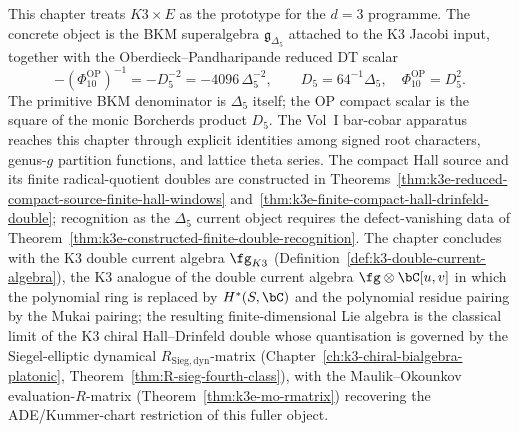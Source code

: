 This chapter treats $K3 \times E$ as the prototype for the $d = 3$ programme. The concrete object is the BKM superalgebra $\mathfrak{g}_{\Delta_5}$ attached to the K3 Jacobi input, together with the Oberdieck--Pandharipande reduced DT scalar
\[
 -(\Phi_{10}^{\mathrm{OP}})^{-1}
 =
 -D_5^{-2}
 =
 -4096\,\Delta_5^{-2},
 \qquad
 D_5=64^{-1}\Delta_5,\quad \Phi_{10}^{\mathrm{OP}}=D_5^2.
\]
The primitive BKM denominator is $\Delta_5$ itself; the OP compact scalar is the square of the monic Borcherds product \(D_5\). The Vol~I bar-cobar apparatus reaches this chapter through explicit identities among signed root characters, genus-$g$ partition functions, and lattice theta series. The compact Hall source and its finite radical-quotient doubles are constructed in Theorems~\ref{thm:k3e-reduced-compact-source-finite-hall-windows} and~\ref{thm:k3e-finite-compact-hall-drinfeld-double}; recognition as the \(\Delta_5\) current object requires the defect-vanishing data of Theorem~\ref{thm:k3e-constructed-finite-double-recognition}. The chapter concludes with the K3 double current algebra $\fg_{K3}$ (Definition~\ref{def:k3-double-current-algebra}), the K3 analogue of the double current algebra $\fg \otimes \bC[u,v]$ in which the polynomial ring is replaced by $H^*(S,\bC)$ and the polynomial residue pairing by the Mukai pairing; the resulting finite-dimensional Lie algebra is the classical limit of the K3 chiral Hall--Drinfeld double whose quantisation is governed by the Siegel-elliptic dynamical $R_{\mathrm{Sieg,dyn}}$-matrix (Chapter~\ref{ch:k3-chiral-bialgebra-platonic}, Theorem~\ref{thm:R-sieg-fourth-class}), with the Maulik--Okounkov evaluation-$R$-matrix (Theorem~\ref{thm:k3e-mo-rmatrix}) recovering the ADE/Kummer-chart restriction of this fuller object.

